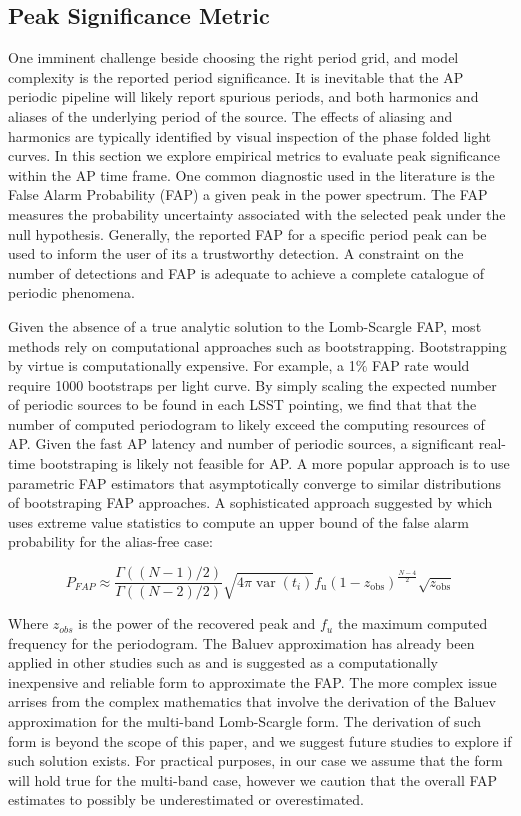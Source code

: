 \documentclass[DM,authoryear,toc]{lsstdoc}
\begin{document}
\subsection{Peak Significance Metric}
One imminent challenge beside choosing the right period grid, and model complexity is the reported period significance. It is inevitable that the AP periodic pipeline will likely report spurious periods, and both harmonics and aliases of the underlying period of the source. The effects of aliasing and harmonics are typically identified by visual inspection of the phase folded light curves. In this section we explore empirical metrics to evaluate peak significance within the AP time frame. One common diagnostic used in the literature is the False Alarm Probability (FAP) a given peak in the power spectrum. The FAP measures the probability uncertainty associated with the selected peak under the null hypothesis. Generally, the reported FAP for a specific period peak can be used to inform the user of its a trustworthy detection. A constraint on the number of detections and FAP is adequate to achieve a complete catalogue of periodic phenomena. 

Given the absence of a true analytic solution to the Lomb-Scargle FAP, most methods rely on computational approaches such as bootstrapping. Bootstrapping by virtue is computationally expensive. For example, a 1$\%$ FAP rate would require 1000 bootstraps per light curve. By simply scaling the expected number of periodic sources to be found in each LSST pointing, we find that that the number of computed periodogram to likely exceed the computing resources of AP. Given the fast AP latency and number of periodic sources, a significant real-time bootstraping is likely not feasible for AP. A more popular approach is to use parametric FAP estimators that asymptotically converge to similar distributions of bootstraping FAP approaches. A sophisticated approach suggested by \citet{Baluev:Baluev2008} which uses extreme value statistics to compute an upper bound of the false alarm probability for the alias-free case:

\begin{equation}
P_{FAP} \approx \frac{\Gamma((N-1) / 2)}{\Gamma((N-2) / 2)} \sqrt{4 \pi \operatorname{var}\left(t_i\right)} f_{\mathrm{u}}\left(1-z_{\mathrm{obs}}\right)^{\frac{N-4}{2}} \sqrt{z_{\mathrm{obs}}}
\end{equation}

Where $z_{obs}$ is the power of the recovered peak and $f_u$ the maximum computed frequency for the periodogram. The Baluev approximation has already been applied in other studies such as \citet{Suveges:Suveges15} and is suggested as a computationally inexpensive and reliable form to approximate the FAP. The more complex issue arrises from the complex mathematics that involve the derivation of the Baluev approximation for the multi-band Lomb-Scargle form. The derivation of such form is beyond the scope of this paper, and we suggest future studies to explore if such solution exists. For practical purposes, in our case we assume that the \citet{Baluev:Baluev2008}  form will hold true for the multi-band case, however we caution that the overall FAP estimates to possibly be underestimated or overestimated. 
\end{document}
